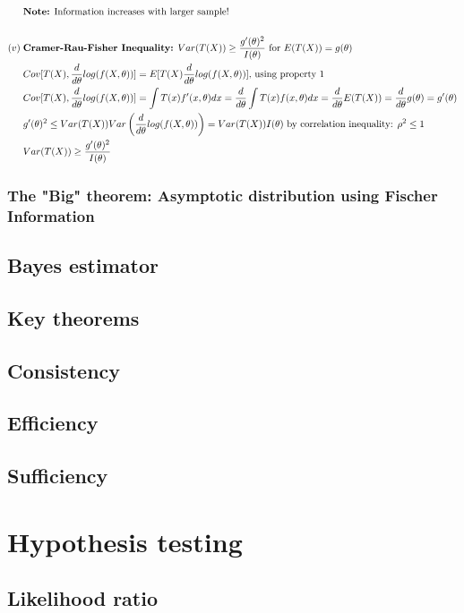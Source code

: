 \documentclass{article}
\begin{document}
\begin{align*}
    & \textrm{\textbf{Note:} Information increases with larger sample!}\\ \\
    (v) \; & \textrm{\textbf{Cramer-Rau-Fisher Inequality:} }Var(T(X)) \geq \frac{g'(\theta)^2}{I(\theta)} \textrm{ for } E(T(X)) = g(\theta)\\
    & Cov[T(X), \frac{d}{d\theta}log(f(X, \theta))] = E[T(X)\frac{d}{d\theta}log(f(X, \theta))] \textrm{, using property 1}\\
    & Cov[T(X), \frac{d}{d\theta}log(f(X, \theta))] = \int T(x)f'(x, \theta)dx = \frac{d}{d\theta} \int T(x)  f(x, \theta)dx = \frac{d}{d\theta}E(T(X)) = \frac{d}{d\theta}g(\theta) = g'(\theta)\\
    &g'(\theta)^2 \leq Var(T(X))Var \left (\frac{d}{d\theta}log(f(X, \theta)) \right) = Var(T(X))I(\theta) \textrm{ by correlation inequality: } \rho^2 \leq 1\\
    &Var(T(X)) \geq \frac{g'(\theta)^2}{I(\theta)}
\end{align*}
\subsubsection{The "Big" theorem: Asymptotic distribution using Fischer Information}


\subsection{Bayes estimator}
\subsection{Key theorems}
\subsection{Consistency}
\subsection{Efficiency}
\subsection{Sufficiency}

\section{Hypothesis testing}
\subsection{Likelihood ratio}
\end{document}
